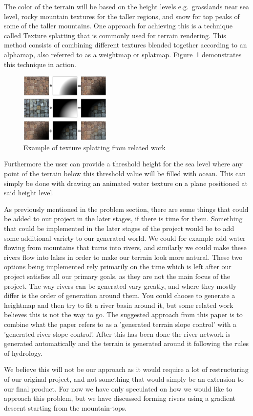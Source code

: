 The color of the terrain will be based on the height levels e.g.\ grasslands near sea level, rocky mountain textures for the taller regions, and snow for top peaks of some of the taller mountains.
One approach for achieving this is a technique called Texture splatting that is commonly used for terrain rendering.
This method consists of combining different textures blended together according to an alphamap, also referred to as a weightmap or splatmap.
Figure~\ref{fig:texture-splatting} demonstrates this technique in action.

\begin{figure}[H]
  \centering
  \includegraphics[width=0.4\textwidth]{figure/texture-splatting.png}
  \caption{Example of texture splatting from related work \cite{wiki:texture-splatting-img}}
  \label{fig:texture-splatting}
\end{figure}

Furthermore the user can provide a threshold height for the sea level where any point of the terrain below this threshold value will be filled with ocean. 
This can simply be done with drawing an animated water texture on a plane positioned at said height level. 

As previously mentioned in the problem section, there are some things that could be added to our project in the later stages, if there is time for them. 
Something that could be implemented in the later stages of the project would be to add some additional variety to our generated world. 
We could for example add water flowing from mountains that turns into rivers, and similarly we could make these rivers flow into lakes in order to make our terrain look more natural.
These two options being implemented rely primarily on the time which is left after our project satisfies all our primary goals, as they are not the main focus of the project. 
The way rivers can be generated vary greatly, and where they mostly differ is the order of generation around them.
You could choose to generate a heightmap and then try to fit a river basin around it, but some related work believes this is not the way to go. 
The suggested approach from this paper is to combine what the paper refers to as a 'generated terrain slope control' with a 'generated river slope control'. 
After this has been done the river network is generated automatically and the terrain is generated around it following the rules of hydrology. 
~\cite{river_gen}

We believe this will not be our approach as it would require a lot of restructuring of our original project, and not something that would simply be an extension to our final product. 
For now we have only speculated on how we would like to approach this problem, but we have discussed forming rivers using a gradient descent starting from the mountain-tops.

